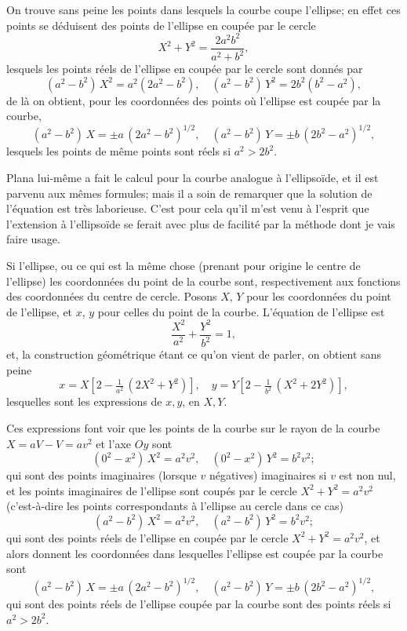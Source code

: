 \documentclass[11pt,a4paper]{book}
\begin{document}
On trouve sans peine les points dans lesquels la courbe coupe l'ellipse; en effet ces points se déduisent des points de l'ellipse en coupée par le cercle
\[
X^2 + Y^2 = \frac{2a^2b^2}{a^2+b^2},
\]
lesquels les points réels de l'ellipse en coupée par le cercle sont donnés par
\[
(a^2-b^2)\,X^2 = a^2(2a^2-b^2),\quad (a^2-b^2)\,Y^2 = 2b^2(b^2-a^2),
\]
de là on obtient, pour les coordonnées des points où l'ellipse est coupée par la courbe,
\[
(a^2-b^2)\,X = \pm a\,(2a^2-b^2)^{1/2},\quad (a^2-b^2)\,Y = \pm b\,(2b^2-a^2)^{1/2},
\]
lesquels les points de même points sont réels si $a^2 > 2b^2$.

Plana lui-même a fait le calcul pour la courbe analogue à l'ellipsoïde, et il est parvenu aux mêmes formules; mais il a soin de remarquer que la solution de l'équation est très laborieuse. C'est pour cela qu'il m'est venu à l'esprit que l'extension à l'ellipsoïde se ferait avec plus de facilité par la méthode dont je vais faire usage.

\setcounter{page}{124}

Si l'ellipse, ou ce qui est la même chose (prenant pour origine le centre de l'ellipse) les coordonnées du point de la courbe sont, respectivement aux fonctions des coordonnées du centre de cercle. Posons $X$, $Y$ pour les coordonnées du point de l'ellipse, et $x$, $y$ pour celles du point de la courbe. L'équation de l'ellipse est
\[
\frac{X^2}{a^2} + \frac{Y^2}{b^2} = 1,
\]
et, la construction géométrique étant ce qu'on vient de parler, on obtient sans peine
\[
x = X\left[2-\tfrac{1}{a^2}\,(2X^2+Y^2)\right],\quad y = Y\left[2-\tfrac{1}{b^2}\,(X^2+2Y^2)\right],
\]
lesquelles sont les expressions de $x, y$, en $X, Y$.

Ces expressions font voir que les points de la courbe sur le rayon de la courbe $X = aV - V = av^2$ et l'axe $Oy$ sont
\[
(0^2 - x^2)\,X^2 = a^2v^2,\quad (0^2-x^2)\,Y^2 = b^2v^2;
\]
qui sont des points imaginaires (lorsque $v$ négatives) imaginaires si $v$ est non nul, et les points imaginaires de l'ellipse sont coupés par le cercle $X^2 + Y^2 = a^2v^2$ (c'est-à-dire les points correspondants à l'ellipse au cercle dans ce cas)
\[
(a^2-b^2)\,X^2 = a^2v^2,\quad (a^2-b^2)\,Y^2 = b^2v^2;
\]
qui sont des points réels de l'ellipse en coupée par le cercle $X^2 + Y^2 = a^2v^2$, et alors donnent les coordonnées dans lesquelles l'ellipse est coupée par la courbe sont
\[
(a^2-b^2)\,X = \pm a\,(2a^2-b^2)^{1/2},\quad (a^2-b^2)\,Y = \pm b\,(2b^2-a^2)^{1/2},
\]
qui sont des points réels de l'ellipse coupée par la courbe sont des points réels si $a^2 > 2b^2$.
\end{document}
